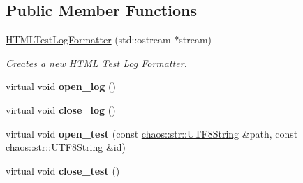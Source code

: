 \subsection*{Public Member Functions}
\begin{DoxyCompactItemize}
\item 
\hypertarget{classchaos_1_1test_1_1log__formatter_1_1_h_t_m_l_test_log_formatter_a62020a38f80ca01d58cac2bc04cd7044}{}\hyperlink{classchaos_1_1test_1_1log__formatter_1_1_h_t_m_l_test_log_formatter_a62020a38f80ca01d58cac2bc04cd7044}{H\+T\+M\+L\+Test\+Log\+Formatter} (std\+::ostream $\ast$stream)\label{classchaos_1_1test_1_1log__formatter_1_1_h_t_m_l_test_log_formatter_a62020a38f80ca01d58cac2bc04cd7044}

\begin{DoxyCompactList}\small\item\em Creates a new H\+T\+M\+L Test Log Formatter. \end{DoxyCompactList}\item 
\hypertarget{classchaos_1_1test_1_1log__formatter_1_1_h_t_m_l_test_log_formatter_a60da960b069095f4df29d02ede1f4b78}{}virtual void {\bfseries open\+\_\+log} ()\label{classchaos_1_1test_1_1log__formatter_1_1_h_t_m_l_test_log_formatter_a60da960b069095f4df29d02ede1f4b78}

\item 
\hypertarget{classchaos_1_1test_1_1log__formatter_1_1_h_t_m_l_test_log_formatter_a590f4ba75c06576df9b07720fbcc851e}{}virtual void {\bfseries close\+\_\+log} ()\label{classchaos_1_1test_1_1log__formatter_1_1_h_t_m_l_test_log_formatter_a590f4ba75c06576df9b07720fbcc851e}

\item 
\hypertarget{classchaos_1_1test_1_1log__formatter_1_1_h_t_m_l_test_log_formatter_a8b8e1cefd176eca4680b407eea5f42cc}{}virtual void {\bfseries open\+\_\+test} (const \hyperlink{classchaos_1_1str_1_1_u_t_f8_string}{chaos\+::str\+::\+U\+T\+F8\+String} \&path, const \hyperlink{classchaos_1_1str_1_1_u_t_f8_string}{chaos\+::str\+::\+U\+T\+F8\+String} \&id)\label{classchaos_1_1test_1_1log__formatter_1_1_h_t_m_l_test_log_formatter_a8b8e1cefd176eca4680b407eea5f42cc}

\item 
\hypertarget{classchaos_1_1test_1_1log__formatter_1_1_h_t_m_l_test_log_formatter_a50aa9b6f10663fd15c3b08535704429d}{}virtual void {\bfseries close\+\_\+test} ()\label{classchaos_1_1test_1_1log__formatter_1_1_h_t_m_l_test_log_formatter_a50aa9b6f10663fd15c3b08535704429d}


\end{DoxyCompactItemize}
